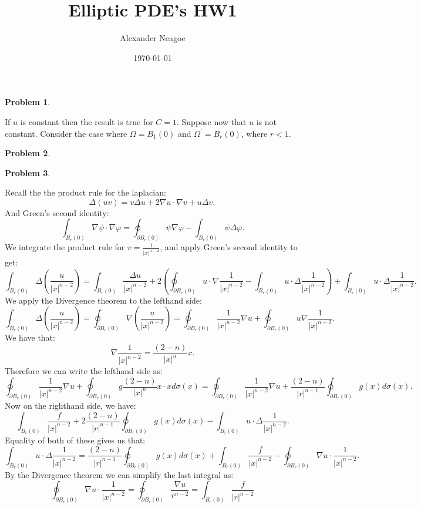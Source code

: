 \documentclass[12pt, a4paper]{article}
\title{Elliptic PDE's HW1}
\author{Alexander Neagoe }
\date{\today}
\newtheorem{problem}{Problem}
\theoremstyle{definition}
\newcommand{\bd}{\partial}
\newcommand{\grad}{\nabla}
\begin{document}
\maketitle

\begin{problem}
\end{problem}
If $u$ is constant then the result is true for $C=1$. Suppose now that $u$ is not constant. Consider the case where $\Omega  = B_1(0)$ and $\Omega^\prime = B_r(0)$, where $r<1$.  
\newpage
\begin{problem}
\end{problem}
\newpage
\begin{problem}
\end{problem}
Recall the the product rule for the laplacian: 
$$\Delta(uv) = v \Delta u + 2\grad u \cdot \grad v + u \Delta v,$$
And Green's second identity:
$$\int_{B_r(0)} \grad \psi \cdot \grad \varphi = \oint_{\bd B_r(0)} \psi \grad \varphi - \int_{B_r(0)} \psi \Delta \varphi.$$
We integrate the product rule for $v= \frac{1}{|x|^{n-2}}$, and apply Green's second identity to get:
$$\int_{B_r(0)}\Delta \left( \frac{u}{|x|^{n-2}} \right) = \int_{B_r(0)} \frac{\Delta u}{|x|^{n-2}}  + 2 \left( \oint_{\bd B_r(0)} u \cdot \grad \frac{1}{|x|^{n-2}} - \int_{B_r(0)}u \cdot \Delta \frac{1}{|x|^{n-2}}\right) + \int_{B_r(0)} u \cdot \Delta \frac{1}{|x|^{n-2}}.$$
We apply the Divergence theorem to the lefthand side: 
$$\int_{B_r(0)}\Delta \left( \frac{u}{|x|^{n-2}} \right) = \oint_{\bd B_r(0)} \grad\left(\frac{u}{|x|^{n-2}}\right) = \oint_{\bd B_r(0)} \frac{1}{|x|^{n-2}} \grad u + \oint_{\bd B_r(0)}u \grad \frac{1}{|x|^{n-2}}.$$
We have that:
$$\grad \frac{1}{|x|^{n-2}} = \frac{(2-n)}{|x|^{n}} x.$$
Therefore we can write the lefthand side as: 
$$\oint_{\bd B_r(0)} \frac{1}{|x|^{n-2}} \grad u  + \oint_{\bd B_r(0)} g \frac{(2-n)}{|x|^n}x \cdot x d\sigma(x) =\oint_{\bd B_r(0)}\frac{1}{|x|^{n-2}} \grad u + \frac{(2-n)}{|r|^{n-1}} \oint_{\bd B_r(0)} g(x) d\sigma(x).$$
Now on the righthand side, we have:
$$\int_{B_r(0)} \frac{f}{|x|^{n-2}} + 2 \frac{(2-n)}{|r|^{n-1}} \oint_{\bd B_r(0)} g(x) d\sigma(x) - \int_{B_r(0)} u \cdot \Delta \frac{1}{|x|^{n-2}}.$$
Equality of both of these gives us that:
$$\int_{B_r(0)} u \cdot \Delta \frac{1}{|x|^{n-2}} = \frac{(2-n)}{|r|^{n-1}} \oint_{\bd B_r(0)} g(x) d\sigma(x) + \int_{B_r(0)} \frac{f}{|x|^{n-2}} - \oint_{\bd B_r(0)} \grad u \cdot \frac{1}{|x|^{n-2}}.$$
By the Divergence theorem we can simplify the last integral as:
$$\oint_{\bd B_r(0)} \grad u \cdot \frac{1}{|x|^{n-2}} = \oint_{\bd B_r(0)} \frac{\grad u}{r^{n-2}} = \int_{B_r(0)} \frac{f}{|r|^{n-2}} $$
\end{document}
